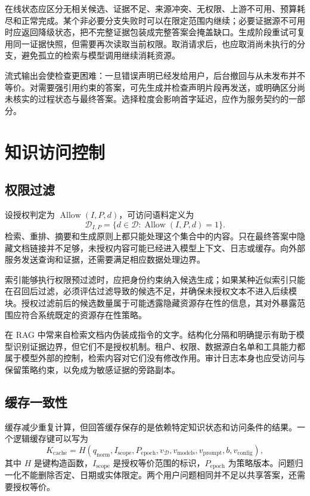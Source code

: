 \documentclass[../textbook.tex]{subfiles}
\begin{document}
在线状态应区分无相关候选、证据不足、来源冲突、无权限、上游不可用、预算耗尽和正常完成。某个非必要分支失败时可以在限定范围内继续；必要证据源不可用时应返回降级状态，把不完整证据包装成完整答案会掩盖缺口。生成阶段重试可复用同一证据快照，但需要再次读取当前权限。取消请求后，也应取消尚未执行的分支，避免孤立的检索与模型调用继续消耗资源。

流式输出会使检查更困难：一旦错误声明已经发给用户，后台撤回与从未发布并不等价。对需要强引用约束的答案，可先生成并检查声明片段再发送，或明确区分尚未核实的过程状态与最终答案。选择粒度会影响首字延迟，应作为服务契约的一部分。

\section{知识访问控制}

\subsection{权限过滤}
设授权判定为 $\operatorname{Allow}(I,P,d)$，可访问语料定义为
\begin{equation}
 \mathcal D_{I,P}=\{d\in\mathcal D:\operatorname{Allow}(I,P,d)=1\}.
\end{equation}
检索、重排、摘要和生成原则上都只能处理这个集合中的内容。只在最终答案中隐藏文档链接并不足够，未授权内容可能已经进入模型上下文、日志或缓存。向外部服务发送查询和证据，还需要满足相应数据处理边界。

索引能够执行权限预过滤时，应把身份约束纳入候选生成；如果某种近似索引只能在召回后过滤，必须评估过滤导致的候选不足，并确保未授权文本不进入后续模块。授权过滤前后的候选数量属于可能透露隐藏资源存在性的信息，其对外暴露范围应符合系统既定的资源存在性策略。

在 RAG 中常来自检索文档内伪装成指令的文字。结构化分隔和明确提示有助于模型识别证据边界，但它们不是授权机制。租户、权限、数据源白名单和工具能力都属于模型外部的控制，检索内容对它们没有修改作用。审计日志本身也应受访问与保留策略约束，以免成为敏感证据的旁路副本。

\subsection{缓存一致性}
缓存减少重复计算，但回答缓存保存的是依赖特定知识状态和访问条件的结果。一个逻辑缓存键可以写为
\begin{equation}
 K_{\mathrm{cache}}=H(q_{\mathrm{norm}},I_{\mathrm{scope}},P_{\mathrm{epoch}},v_{\mathcal D},
 v_{\mathrm{models}},v_{\mathrm{prompt}},b,v_{\mathrm{config}}),
\end{equation}
其中 $H$ 是键构造函数，$I_{\mathrm{scope}}$ 是授权等价范围的标识，$P_{\mathrm{epoch}}$ 为策略版本。问题归一化不能删除否定、日期或实体限定。两个用户问题相同并不足以共享答案，还需要授权等价。
\end{document}

